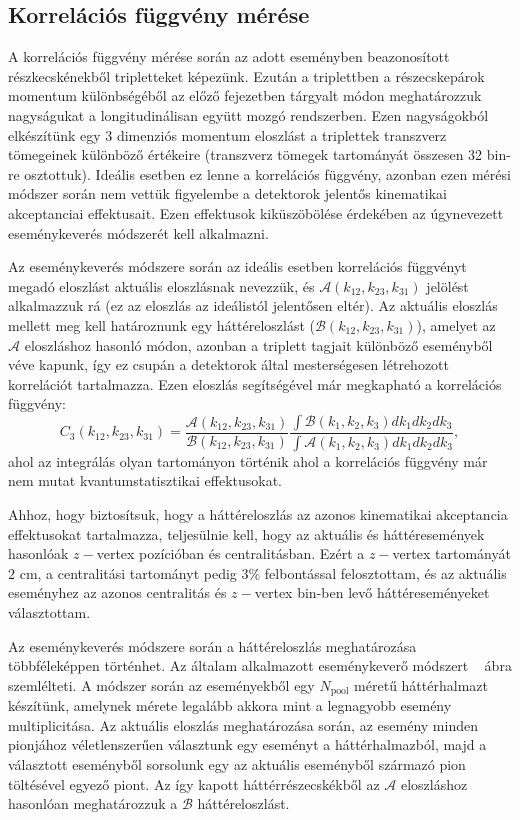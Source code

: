 \documentclass[11pt,a4paper]{article}
\numberwithin{equation}{subsection}
\numberwithin{figure}{section}
\begin{document}
\subsection{Korrelációs függvény mérése}

A korrelációs függvény mérése során az adott eseményben beazonosított részkecskénekből tripletteket képezünk. Ezután a triplettben a részecskepárok momentum különbségéből az előző fejezetben tárgyalt módon meghatározzuk nagyságukat a longitudinálisan együtt mozgó rendszerben. Ezen nagyságokból elkészítünk egy 3 dimenziós momentum eloszlást a triplettek transzverz tömegeinek különböző értékeire (transzverz tömegek tartományát összesen 32 bin-re osztottuk). Ideális esetben ez lenne a korrelációs függvény, azonban ezen mérési módszer során nem vettük figyelembe a detektorok jelentős kinematikai akceptanciai effektusait. Ezen effektusok kiküszöbölése érdekében az úgynevezett eseménykeverés módszerét kell alkalmazni.

Az eseménykeverés módszere során az ideális esetben korrelációs függvényt megadó eloszlást aktuális eloszlásnak nevezzük, és $\mathcal{A}(k_{12},k_{23},k_{31})$ jelölést alkalmazzuk rá (ez az eloszlás az ideálistól jelentősen eltér). Az aktuális eloszlás mellett meg kell határoznunk egy háttéreloszlást ($\mathcal{B}(k_{12},k_{23},k_{31})$), amelyet az $\mathcal{A}$ eloszláshoz hasonló módon, azonban a triplett tagjait különböző eseményből véve kapunk, így ez csupán a detektorok által mesterségesen létrehozott korrelációt tartalmazza. Ezen eloszlás segítségével már megkapható a korrelációs függvény:
\begin{equation}
C_3(k_{12},k_{23},k_{31}) = \frac{\mathcal{A}(k_{12},k_{23},k_{31})}{\mathcal{B}(k_{12},k_{23},k_{31})}\frac{\int \mathcal{B}(k_1, k_2, k_3) dk_1dk_2dk_3}{\int \mathcal{A}(k_1,k_2,k_3)dk_1dk_2dk_3},
\end{equation}
ahol az integrálás olyan tartományon történik ahol a korrelációs függvény már nem mutat kvantumstatisztikai effektusokat.

Ahhoz, hogy biztosítsuk, hogy a háttéreloszlás az azonos kinematikai akceptancia effektusokat tartalmazza, teljesülnie kell, hogy az aktuális és háttéresemények hasonlóak $z-$vertex pozícióban és centralitásban. Ezért a $z-$vertex tartományát $2$ cm, a centralitási tartományt pedig $3\%$ felbontással felosztottam, és az aktuális eseményhez az azonos centralitás és $z-$vertex bin-ben levő háttéreseményeket választottam.

Az eseménykeverés módszere során a háttéreloszlás meghatározása többféleképpen történhet. Az általam alkalmazott eseménykeverő módszert ~ ábra szemlélteti. A módszer során az eseményekből egy $N_\mathrm{pool}$ méretű háttérhalmazt készítünk, amelynek mérete legalább akkora mint a legnagyobb esemény multiplicitása. Az aktuális eloszlás meghatározása során, az esemény minden pionjához véletlenszerűen választunk egy eseményt a háttérhalmazból, majd a választott eseményből sorsolunk egy az aktuális eseményből származó pion töltésével egyező piont. Az így kapott háttérrészecskékből az $\mathcal{A}$ eloszláshoz hasonlóan meghatározzuk a $\mathcal{B}$ háttéreloszlást. 
\end{document}
